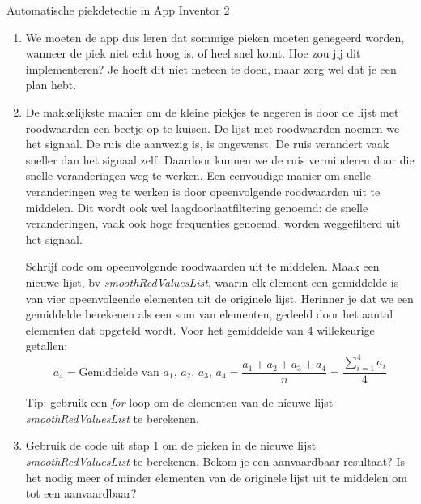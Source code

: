 \begin{opdracht}{Automatische piekdetectie in App Inventor 2}
\begin{enumerate}
\begin{opmerking}
	\end{opmerking}
	
	\begin{opmerking}
		Vaak is de lijst met roodwaarden een beetje \textquotedblleft ruizig \textquotedblright. Dit zorgt ervoor dat de app meer pieken detecteert dan wij zouden doen. Soms zien we een klein piekje in het signaal, dat we negeren, omdat het maar een kleine piek is, of omdat de piek te snel na een grote hartslagpiek komt. 
	\end{opmerking}

	\item We moeten de app dus leren dat sommige pieken moeten genegeerd worden, wanneer de piek niet echt hoog is, of heel snel komt. Hoe zou jij dit implementeren? Je hoeft dit niet meteen te doen, maar zorg wel dat je een plan hebt.
	
	\item De makkelijkste manier om de kleine piekjes te negeren is door de lijst met roodwaarden een beetje op te kuisen. De lijst met roodwaarden noemen we het signaal. De ruis die aanwezig is, is ongewenst. De ruis verandert vaak sneller dan het signaal zelf. Daardoor kunnen we de ruis verminderen door die snelle veranderingen weg te werken. Een eenvoudige manier om snelle veranderingen weg te werken is door opeenvolgende roodwaarden uit te middelen. Dit wordt ook wel laagdoorlaatfiltering genoemd: de snelle veranderingen, vaak ook hoge frequenties genoemd, worden weggefilterd uit het signaal.
	
	Schrijf code om opeenvolgende roodwaarden uit te middelen. Maak een nieuwe lijst, bv \emph{smoothRedValuesList}, waarin elk element een gemiddelde is van vier opeenvolgende elementen uit de originele lijst. Herinner je dat we een gemiddelde berekenen als een som van elementen, gedeeld door het aantal elementen dat opgeteld wordt.
	Voor het gemiddelde van 4 willekeurige getallen:
	\begin{equation*}
	\overline{a_4} = \text{Gemiddelde van $a_1$, $a_2$, $a_3$, $a_4$} = \frac{a_1+a_2+a_3+a_4}{n} = \frac{\sum_{i=1}^{4} a_i}{4}
	\end{equation*}
	
	\begin{opmerking}
		Tip: gebruik een \emph{for}-loop om de elementen van de nieuwe lijst \emph{smoothRedValuesList} te berekenen.
	\end{opmerking}

	\item Gebruik de code uit stap 1 om de pieken in de nieuwe lijst \emph{smoothRedValuesList} te berekenen. Bekom je een aanvaardbaar resultaat? Is het nodig meer of minder elementen van de originele lijst uit te middelen om tot een aanvaardbaar?
	

\end{enumerate}
\end{opdracht}
